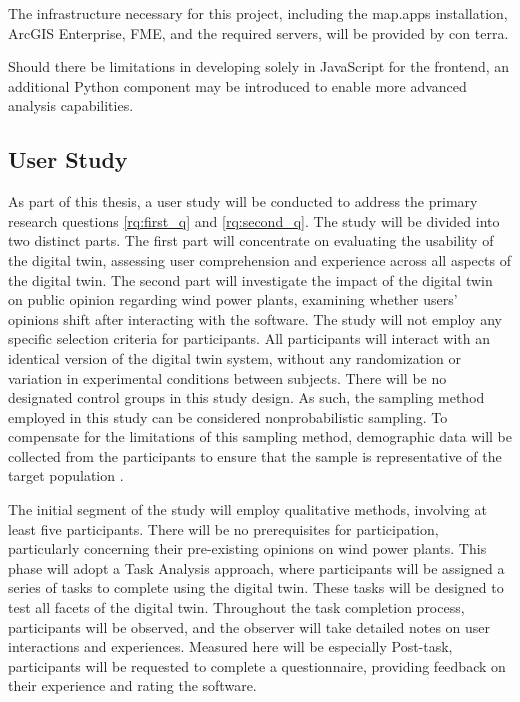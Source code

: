 \documentclass[11pt, titlepage, a4paper]{scrartcl}
\begin{document}
\begin{linenumbers}
    The infrastructure necessary for this project, including the map.apps installation, ArcGIS Enterprise, FME, and the required servers, will be provided by con terra.

    Should there be limitations in developing solely in JavaScript for the frontend, an additional Python component may be introduced to enable more advanced analysis capabilities.


    \subsection{User Study}
    As part of this thesis, a user study will be conducted to address the primary research questions \cref{rq:first_q} and \cref{rq:second_q}. The study will be divided into two distinct parts. The first part will concentrate on evaluating the usability of the digital twin, assessing user comprehension and experience across all aspects of the digital twin. The second part will investigate the impact of the digital twin on public opinion regarding wind power plants, examining whether users' opinions shift after interacting with the software.
    The study will not employ any specific selection criteria for participants. All participants will interact with an identical version of the digital twin system, without any randomization or variation in experimental conditions between subjects. There will be no designated control groups in this study design. As such, the sampling method employed in this study can be considered nonprobabilistic sampling. To compensate for the limitations of this sampling method, demographic data will be collected from the participants to ensure that the sample is representative of the target population \cite{lazarResearchMethodsHuman2017}.

    The initial segment of the study will employ qualitative methods, involving at least five participants. There will be no prerequisites for participation, particularly concerning their pre-existing opinions on wind power plants. This phase will adopt a Task Analysis approach, where participants will be assigned a series of tasks to complete using the digital twin. These tasks will be designed to test all facets of the digital twin. Throughout the task completion process, participants will be observed, and the observer will take detailed notes on user interactions and experiences. Measured here will be especially
    Post-task, participants will be requested to complete a questionnaire, providing feedback on their experience and rating the software.


\end{linenumbers}
\end{document}
